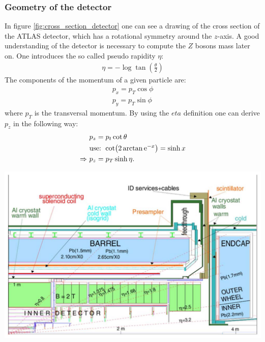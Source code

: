 \documentclass[12pt, a4paper, bibliography=totoc]{scrartcl}
\begin{document}
\begin{multicols}{2}
\subsubsection{Geometry of the detector}
In figure \ref{fig:cross_section_detector} one can see a drawing of the cross section of the ATLAS detector, which has a rotational symmetry around the $z$-axis.
A good understanding of the detector is necessary to compute the $Z$ bosons mass later on. 
One introduces the so called pseudo rapidity $\eta$:
\begin{align}
    \eta = - \log \tan \left( \frac{\theta}{2} \right)
\end{align}
The components of the momentum of a given particle are:
\begin{align}
    p_x = p_T \cos \phi \\
    p_y = p_T \sin \phi
\end{align}
where $p_T$ is the transversal momentum.
By using the $eta$ definition one can derive $p_z$ in the following way:
\begin{align}
    & p_z = p_t \cot \theta \\
    & \text{use: } \cot (2\arctan \mathrm{e}^{-x}) = \sinh x \\
    \Rightarrow \ & p_z = p_T \sinh \eta .
\end{align}
\begin{center}
\includegraphics[width=\linewidth]{fig/detector_geometry.png}
\label{fig:cross_section_detector}
\end{center}


\end{multicols}
\end{document}

